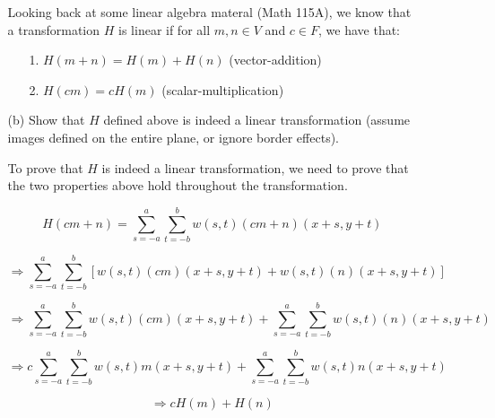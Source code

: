 \documentclass{article}
\begin{document}
\begin{enumerate}
\begin{enumerate}
Looking back at some linear algebra materal (Math 115A), we know that a transformation $H$ is linear if for all $m,n \in V$ and $c \in F$,
we have that:

\begin{enumerate}
\item[1.] $H(m + n) = H(m) + H(n)$ \quad (vector-addition)
\item[2.] $H(cm)=cH(m)$ \quad\quad\kern 0.45in (scalar-multiplication)
\end{enumerate}

\item[(b)]  Show that $H$ defined above is indeed a linear transformation (assume images defined
on the entire plane, or ignore border effects).

To prove that $H$ is indeed a linear transformation, we need to prove that the two properties above hold throughout the transformation.

\begin{equation}
H(cm + n) = \sum_{s=-a}^{a} \sum_{t=-b}^{b} w(s,t)(cm+n)(x+s, y+t)
\end{equation}

\begin{equation}
\Rightarrow \sum_{s=-a}^{a} \sum_{t=-b}^{b} \left[ w(s,t)(cm)(x+s,y+t) + w(s,t)(n)(x+s,y+t) \right]
\end{equation}

\begin{equation}
\Rightarrow \sum_{s=-a}^{a} \sum_{t=-b}^{b} w(s,t)(cm)(x+s,y+t) + \sum_{s=-a}^{a} \sum_{t=-b}^{b} w(s,t)(n)(x+s,y+t)
\end{equation}

\begin{equation}
\Rightarrow c\sum_{s=-a}^{a} \sum_{t=-b}^{b} w(s,t)m(x+s,y+t) + \sum_{s=-a}^{a} \sum_{t=-b}^{b} w(s,t)n(x+s,y+t)
\end{equation}

\begin{equation}
\Rightarrow cH(m) + H(n)
\end{equation}

\end{enumerate}
\end{enumerate}
\end{document}
